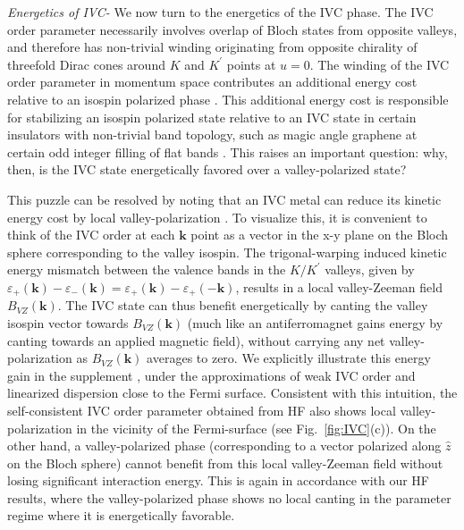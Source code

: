\documentclass[aps,pra,twocolumn,superscriptaddress,10pt,article,nofootinbib,showpacs,longbibliography]{revtex4-1}
\def \k{{\mathbf k}}
\begin{document}
\emph{Energetics of IVC-}
We now turn to the energetics of the IVC phase. 
The IVC order parameter necessarily involves overlap of Bloch states from opposite valleys, and therefore has non-trivial winding originating from opposite chirality of threefold Dirac cones around $K$ and $K^\prime$ points at $u=0$. 
The winding of the IVC order parameter in momentum space contributes an additional energy cost relative to an isospin polarized phase \cite{SM}.
This additional energy cost is responsible for stabilizing an isospin polarized state relative to an IVC state in certain insulators with non-trivial band topology, such as magic angle graphene at certain odd integer filling of flat bands \cite{Goldhaber,Serlin2019,BCZ2020,ZMS2019,NickPRX}.
This raises an important question: why, then, is the IVC state energetically favored over a valley-polarized state?


This puzzle can be resolved by noting that an IVC metal can reduce its kinetic energy cost by local valley-polarization \cite{AdrianTBG,EslamNC}.
To visualize this, it is convenient to think of the IVC order at each $\k$ point as a vector in the x-y plane on the Bloch sphere corresponding to the valley isospin. 
The trigonal-warping induced kinetic energy mismatch between the valence bands in the $K/K^\prime$ valleys, given by $\varepsilon_{+}(\k) - \varepsilon_{-}(\k) = \varepsilon_{+}(\k) - \varepsilon_{+}(-\k)$, results in a local valley-Zeeman field $B_{VZ}(\k)$. 
The IVC state can thus benefit energetically by canting the valley isospin vector towards $B_{VZ}(\k)$ (much like an antiferromagnet gains energy by canting towards an applied magnetic field), without carrying any net valley-polarization as $B_{VZ}(\k)$ averages to zero.
We explicitly illustrate this energy gain in the supplement \cite{SM}, under the approximations of weak IVC order and linearized dispersion close to the Fermi surface. 
Consistent with this intuition, the self-consistent IVC order parameter obtained from HF also shows local valley-polarization in the vicinity of the Fermi-surface (see Fig.~\ref{fig:IVC}(c)).
On the other hand, a valley-polarized phase (corresponding to a vector polarized along $\hat{z}$ on the Bloch sphere) cannot benefit from this local valley-Zeeman field without losing significant interaction energy.
This is again in accordance with our HF results, where the valley-polarized phase shows no local canting in the parameter regime where it is energetically favorable.
\end{document}
